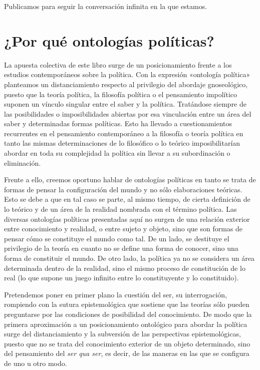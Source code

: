 Publicamos para seguir la conversación infinita en la que estamos.

\chapter{¿Por qué ontologías políticas?}


La apuesta colectiva de este libro surge de un posicionamiento frente a los estudios contemporáneos sobre la política. Con la expresión «ontología política» planteamos un distanciamiento respecto al privilegio del abordaje gnoseológico, puesto que la teoría política, la filosofía política o el pensamiento impolítico suponen un vínculo singular entre el saber y la política. Tratándose siempre de las posibilidades o imposibilidades abiertas por esa vinculación entre un área del saber y determinadas formas políticas. Esto ha llevado a cuestionamientos recurrentes en el pensamiento contemporáneo a la filosofía o teoría política en tanto las mismas determinaciones de lo filosófico o lo teórico imposibilitarían abordar en toda su complejidad la política sin llevar a su subordinación o eliminación.

Frente a ello, creemos oportuno hablar de ontologías políticas en tanto se trata de formas de pensar la configuración del mundo y no sólo elaboraciones teóricas. Esto se debe a que en tal caso se parte, al mismo tiempo, de cierta definición de lo teórico y de un área de la realidad nombrada con el término política. Las diversas ontologías políticas presentadas aquí no surgen de una relación exterior entre conocimiento y realidad, o entre sujeto y objeto, sino que son formas de pensar cómo se constituye el mundo como tal. De un lado, se destituye el privilegio de la teoría en cuanto no se define una forma de conocer, sino una forma de constituir el mundo. De otro lado, la política ya no se considera un área determinada dentro de la realidad, sino el mismo proceso de constitución de lo real (lo que supone un juego infinito entre lo constituyente y lo constituido).

Pretendemos poner en primer plano la cuestión del ser, su interrogación, rompiendo con la sutura epistemológica que sostiene que las teorías sólo pueden preguntarse por las condiciones de posibilidad del conocimiento. De modo que la primera aproximación a un posicionamiento ontológico para abordar la política surge del distanciamiento y la subversión de las perspectivas epistemológicas, puesto que no se trata del conocimiento exterior de un objeto determinado, sino del pensamiento del \emph{ser qua ser}, es decir, de las maneras en las que se configura de uno u otro modo.

